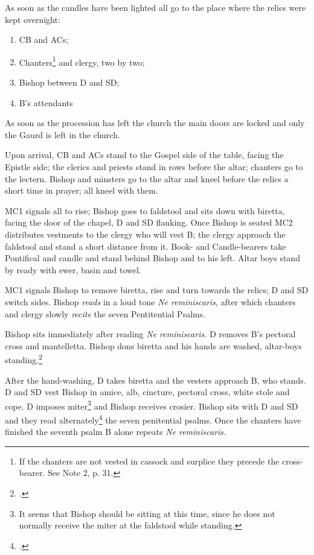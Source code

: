 \documentclass[letterpaper]{report}
\begin{document}
{\rubric As soon as the candles have been lighted all go to the place where the
relics were kept overnight:

\begin{enumerate}

    \item CB and ACs;

    \item Chanters\footnote{If the chanters are not vested in cassock and
        surplice they precede the cross-bearer. See \cite{consecranda} Note 2,
        p. 31.} and clergy, two by two;

    \item Bishop between D and SD;

    \item B's attendants

\end{enumerate}

As soon as the procession has left the church the main doors are locked and
only the Gaurd is left in the church.

\rubric Upon arrival, CB and ACs stand to the Gospel side of the table, facing
the Epistle side; the clerics and priests stand in rows before the altar;
chanters go to the lectern. Bishop and minsters go to the altar and kneel before the
relics a short time in prayer; all kneel with them.

\rubric MC1 signals all to rise; Bishop goes to faldstool and sits down with
biretta, facing the door of the chapel, D and SD flanking. Once Bishop is seated MC2
distributes vestments to the clergy who will vest B; the clergy approach the
faldstool and stand a short distance from it. Book- and Candle-bearers take
Pontifical and candle and stand behind Bishop and to his left. Altar boys stand by
ready with ewer, basin and towel.

\rubric MC1 signals Bishop to remove biretta, rise and turn towards the relics; D
and SD switch sides. Bishop \textit{reads} in a loud tone \textit{Ne reminiscaris},
after which chanters and clergy slowly \textit{recite} the seven Pentitential
Psalms.

\rubric Bishop sits immediately after reading \textit{Ne reminiscaris.} D removes
B's pectoral cross and mantelletta. Bishop dons biretta and his hands are washed,
altar-boys standing.\footcite[See][note 1, p. 39.]{consecranda}

\rubric After the hand-washing, D takes biretta and the vesters approach B, who
stands. D and SD vest Bishop in amice, alb, cincture, pectoral cross, white stole
and cope. D imposes miter\footnote{It seems that Bishop should be sitting at this
time, since he does not normally receive the miter at the faldstool while
standing.} and Bishop receives crosier. Bishop sits with D and SD and they read
alternately\footcite[The bishop usually reads the first verse of each psalm and
recites the verse \textit{Gloria Patri.}][note 3, p. 39.]{consecranda} the
seven penitential psalms. Once the chanters have finished the seventh psalm B
alone repeats \textit{Ne reminiscaris.}

}
\end{document}
